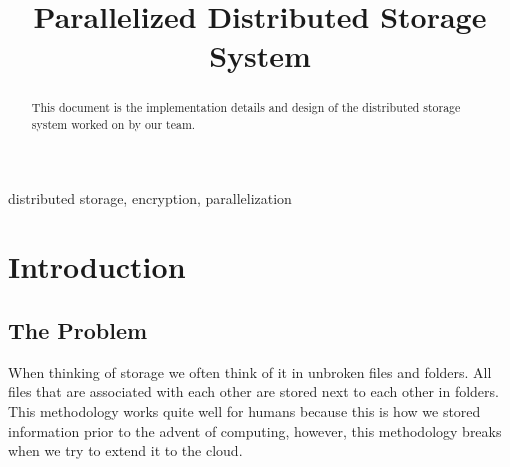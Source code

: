 \documentclass[conference]{IEEEtran}
\begin{document}
\title{Parallelized Distributed Storage System\\
}

\author{
\and
{}
\and
{}
\and
{}
}
\maketitle

\begin{abstract}
This document is the implementation details and design of the distributed storage system worked on by our team.
\end{abstract}

\begin{IEEEkeywords}
distributed storage, encryption, parallelization
\end{IEEEkeywords}

\section{Introduction}

\subsection{The Problem}
When thinking of storage we often think of it in unbroken files and folders.
All files that are associated with each other are stored next to each other in folders.
This methodology works quite well for humans because this is how we stored information
prior to the advent of computing, however,
this methodology breaks when we try to extend it to the cloud.
\end{document}
